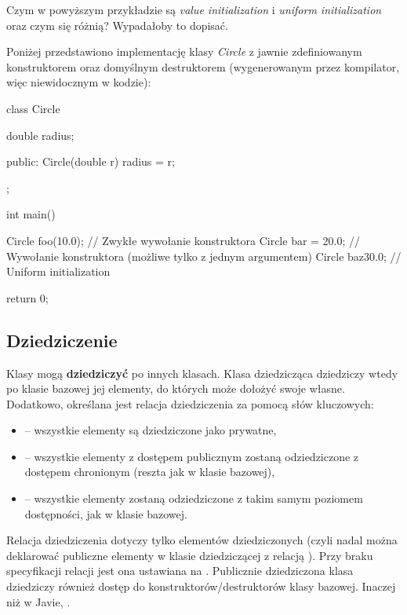 \begin{editorsnote}
    Czym w powyższym przykładzie są \textit{value initialization} i \textit{uniform initialization} oraz czym się różnią? Wypadałoby to dopisać.
\end{editorsnote}

\begin{example}
    Poniżej przedstawiono implementację klasy \textit{Circle} z jawnie zdefiniowanym konstruktorem oraz domyślnym destruktorem (wygenerowanym przez kompilator, więc niewidocznym w kodzie):

    \begin{cpp}
    class Circle {
        double radius;
        
      public:
        Circle(double r) { radius = r; }
    };
    
    int main() {
      Circle foo(10.0);   // Zwykłe wywołanie konstruktora
      Circle bar = 20.0;  // Wywołanie konstruktora (możliwe tylko z jednym argumentem)
      Circle baz{30.0};   // Uniform initialization
      
      return 0;
    }
    \end{cpp}
\end{example}

\subsection{Dziedziczenie}

Klasy mogą \textbf{dziedziczyć} po innych klasach. Klasa dziedzicząca dziedziczy wtedy po klasie bazowej jej elementy, do których może dołożyć swoje własne. Dodatkowo, określana jest relacja dziedziczenia za pomocą słów kluczowych:
\begin{itemize}   
    \item {} -- wszystkie elementy są dziedziczone jako prywatne, \quad \textbf{} %
    \item {} -- wszystkie elementy z dostępem publicznym zostaną odziedziczone z dostępem chronionym (reszta jak w klasie bazowej),
    \item {} -- wszystkie elementy zostaną odziedziczone z takim samym poziomem dostępności, jak w klasie bazowej.
\end{itemize}
Relacja dziedziczenia dotyczy tylko elementów dziedziczonych (czyli nadal można deklarować publiczne elementy w klasie dziedziczącej z relacją ). Przy braku specyfikacji relacji jest ona ustawiana na . Publicznie dziedziczona klasa dziedziczy również dostęp do konstruktorów/destruktorów klasy bazowej. Inaczej niż w Javie, .

